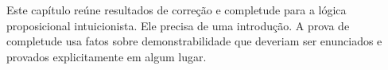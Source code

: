 \documentclass[../../../include/open-logic-chapter]{subfiles}
\begin{document}

\begin{editorial}
  Este capítulo reúne resultados de correção e completude para a lógica
  proposicional intuicionista. Ele precisa de uma introdução. A prova de
  completude usa fatos sobre demonstrabilidade que deveriam ser
  enunciados e provados explicitamente em algum lugar.
\end{editorial}


\OLEndChapterHook
\end{document}
